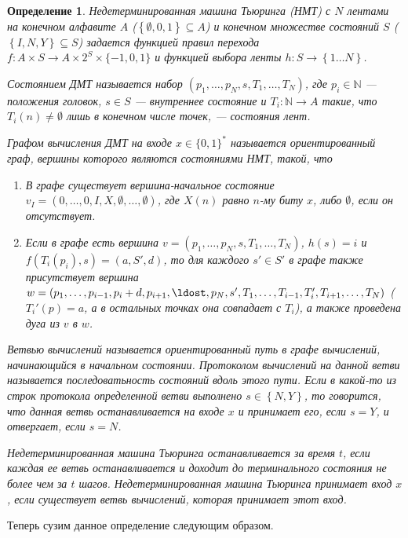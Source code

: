 \documentclass[14pt, a4paper]{extreport}
\newtheorem{definition}{\indent Определение}
\newcommand{\word}{\{0, 1\}^*}
\newcommand{\set}[1]{\left\{#1\right\}}
\begin{document}
\begin{definition}Недетерминированная машина Тьюринга (НМТ) с $N$ лентами на конечном алфавите $A$ ($\set{\emptyset, 0, 1} \subseteq A$) и конечном множестве состояний $S$ ($\set{I, N, Y} \subseteq S$) задается функцией правил перехода $f: A \times S \longrightarrow A \times 2^S \times \{-1, 0, 1\}$ и функцией выбора ленты $h: S \longrightarrow \set{1\ldots N}$.

Состоянием ДМТ называется набор $\left(p_1, \ldots, p_N, s, T_1, \ldots, T_N\right)$, где $p_i \in \mathbb{N}$ --- положения головок, $s \in S$ --- внутреннее состояние и $T_i: \mathbb{N} \longrightarrow A$ такие, что $T_i(n) \neq \emptyset$ лишь в конечном числе точек, --- состояния лент.

Графом вычисления ДМТ на входе $x \in \word$ называется ориентированный граф, вершины которого являются состояниями НМТ, такой, что
\begin{enumerate}
    \item В графе существует вершина-начальное состояние $v_I = \left(0, \ldots, 0, I, X, \emptyset, \ldots, \emptyset\right)$, где $X(n)$ равно $n$-му биту $x$, либо $\emptyset$, если он отсутствует.
    \item Если в графе есть вершина $v = \left(p_1, \ldots, p_N, s, T_1, \ldots, T_N\right)$, $h(s) = i$ и $f(T_i(p_i), s) = (a, S', d)$, то для каждого $s' \in S'$ в графе также присутствует вершина $w = \left(p_1, \ldots, p_{i-1}, p_i + d, p_{i+1}, \ldost, p_N, s', T_1, \ldots, T_{i-1}, T'_i, T_{i+1}, \ldots, T_N\right)$ ($T_i'(p) = a$, а в остальных точках она совпадает с $T_i$), а также проведена дуга из $v$ в $w$.
\end{enumerate}

Ветвью вычислений называется ориентированный путь в графе вычислений, начинающийся в начальном состоянии. Протоколом вычислений на данной ветви называется последоватьность состояний вдоль этого пути.
Если в какой-то из строк протокола определенной ветви выполнено $s \in \set{N, Y}$, то говорится, что данная ветвь останавливается на входе $x$ и принимает его, если $s = Y$, и отвергает, если $s = N$. 

Недетерминированная машина Тьюринга останавливается за время $t$, если каждая ее ветвь останавливается и доходит до терминального состояния не более чем за $t$ шагов. 
Недетерминированная машина Тьюринга принимает вход $x$, если существует ветвь вычислений, которая принимает этот вход.
\end{definition}
Теперь сузим данное определение следующим образом.
\end{document}
